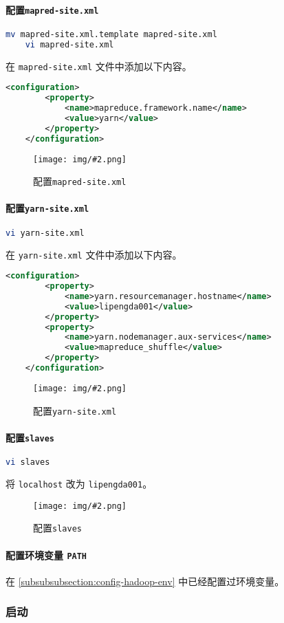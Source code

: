 \documentclass{article}
\newcommand{\img}[3][0.9]{%
    \begin{figure}[H]
        \centering
        \texttt{[image: img/\#2.png]}
        \caption{#3}
    \end{figure}
}
\newcommand{\subsubsubsection}[1]{\paragraph{#1}\mbox{}}
\begin{document}
\subsubsubsection{配置\texttt{mapred-site.xml}}

\begin{lstlisting}[language=bash]
    mv mapred-site.xml.template mapred-site.xml
    vi mapred-site.xml
\end{lstlisting}

在 \texttt{mapred-site.xml} 文件中添加以下内容。

\begin{lstlisting}[language=xml]
    <configuration>
        <property>
            <name>mapreduce.framework.name</name>
            <value>yarn</value>
        </property>
    </configuration>
\end{lstlisting}

\img{3.1.4.1}{配置\texttt{mapred-site.xml}}

\subsubsubsection{配置\texttt{yarn-site.xml}}

\begin{lstlisting}[language=bash]
    vi yarn-site.xml
\end{lstlisting}

在 \texttt{yarn-site.xml} 文件中添加以下内容。

\begin{lstlisting}[language=xml]
    <configuration>
        <property>
            <name>yarn.resourcemanager.hostname</name>
            <value>lipengda001</value>
        </property>
        <property>
            <name>yarn.nodemanager.aux-services</name>
            <value>mapreduce_shuffle</value>
        </property>
    </configuration>
\end{lstlisting}

\img{3.1.5.1}{配置\texttt{yarn-site.xml}}

\subsubsubsection{配置\texttt{slaves}}

\begin{lstlisting}[language=bash]
    vi slaves
\end{lstlisting}

将 \texttt{localhost} 改为 \texttt{lipengda001}。

\img{3.1.6.1}{配置\texttt{slaves}}

\subsubsubsection{配置环境变量 \texttt{PATH}}

在 \ref{subsubsubsection:config-hadoop-env} 中已经配置过环境变量。

\subsubsection{启动}
\end{document}
